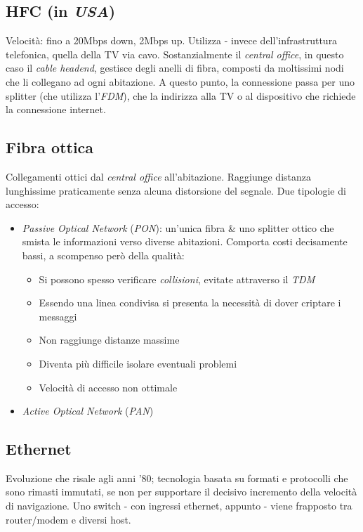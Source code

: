 \subsection{HFC (in \textit{USA})}
Velocità: fino a 20Mbps down, 2Mbps up.
Utilizza - invece dell'infrastruttura telefonica, quella della TV via cavo.
Sostanzialmente il \textit{central office}, in questo caso il \textit{cable headend}, gestisce degli anelli di fibra, composti da moltissimi nodi che li collegano ad ogni abitazione. A questo punto, la connessione passa per uno splitter (che utilizza l'\textit{FDM}), che la indirizza alla TV o al dispositivo che richiede la connessione internet. 

\subsection{Fibra ottica}
Collegamenti ottici dal \textit{central office} all'abitazione. Raggiunge distanza lunghissime praticamente senza alcuna distorsione del segnale.
Due tipologie di accesso:
\begin{itemize}
	\item \textit{Passive Optical Network} (\textit{PON}): un'unica fibra \& uno splitter ottico che smista le informazioni verso diverse abitazioni. Comporta costi decisamente bassi, a scompenso però della qualità:
	\begin{itemize}
		\item Si possono spesso verificare \textit{collisioni}, evitate attraverso il \textit{TDM}
		\item Essendo una linea condivisa si presenta la necessità di dover criptare i messaggi
		\item Non raggiunge distanze massime
		\item Diventa più difficile isolare eventuali problemi
		\item Velocità di accesso non ottimale
	\end{itemize}
	\item \textit{Active Optical Network} (\textit{PAN})
\end{itemize}

\subsection{Ethernet}
Evoluzione che risale agli anni '80; tecnologia basata su formati e protocolli che sono rimasti immutati, se non per supportare il decisivo incremento della velocità di navigazione.
Uno switch - con ingressi ethernet, appunto - viene frapposto tra router/modem e diversi host.

